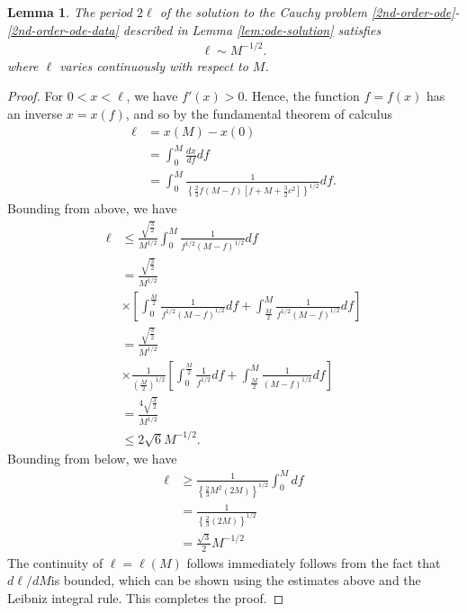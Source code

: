 \documentclass[12pt,reqno]{amsart}
\numberwithin{equation}{section}  %
\newtheorem{lemma}[theorem]{Lemma}
\begin{document}
%
%
%
%
%
%
%
%
%
\newpage
\begin{lemma}
  The period $2 \ell$ of the solution to the Cauchy problem
  \eqref{2nd-order-ode}-\eqref{2nd-order-ode-data} described in Lemma
  \ref{lem:ode-solution} satisfies
  \begin{equation}
  \begin{split}
    \ell \sim M^{-1/2}.
  \end{split}
  \label{period-est}
  \end{equation}
  where $\ell$ varies continuously with respect to $M$.
\label{lem:period-est}
\end{lemma}
%
%
%
%
\begin{proof}
%
For $0 < x < \ell$, we have $f'(x) > 0$. Hence, the function $f = f(x)$ has an
inverse $x = x(f)$, and so by the fundamental theorem of calculus 
%
%
\begin{equation*}
\begin{split}
\ell & = x(M) - x(0)
\\
& = \int_{0}^{M} \frac{dx}{df} df
\\
& = \int_{0}^{M} \frac{1}{ \left\{ \frac{2}{3}f(M-f)
\left[ f + M + \frac{3}{2} c^{2} \right] \right\}^{1/2}} df.
\end{split}
\end{equation*}
%
Bounding from above, we have
%
%
\begin{equation*}
\begin{split}
\ell
& \le \frac{\sqrt{\frac{3}{2}}}{M^{1/2}} \int_{0}^{M} \frac{1}{f^{1/2}(M-f)^{1/2}}df
\\
& = \frac{\sqrt{\frac{3}{2}}}
{M^{1/2}} 
\\
& \times \left[ \int_{0}^{\frac{M}{2}} \frac{1}{f^{1/2}(M-f)^{1/2}}df 
+ \int_{\frac{M}{2}}^{M} \frac{1}{f^{1/2}(M-f)^{1/2}}df
\right]
\\
& = \frac{\sqrt{\frac{3}{2}}}
{M^{1/2}} 
\\
& \times \frac{1}{\left( \frac{M}{2} \right)^{1/2}} \left[ \int_{0}^{\frac{M}{2}} \frac{1}{f^{1/2}}df 
+ \int_{\frac{M}{2}}^{M} \frac{1}{(M-f)^{1/2}}df
\right]
\\
& = \frac{4 \sqrt{\frac{3}{2}}}
{M^{1/2}} 
\\
& \le 2 \sqrt{6} M ^{-1/2}.
\end{split}
\end{equation*}
%
%
Bounding from below, we have
%
%
\begin{equation*}
\begin{split}
\ell
& \ge  \frac{1}{ \left\{ \frac{2}{3}M^{2}
\left( 2M 
\right) \right\}^{1/2}} \int_{0}^{M} df
\\
& = \frac{1}{\left\{ \frac{2}{3}
\left( 2M 
\right) \right\}^{1/2}} 
\\
& = \frac{\sqrt{3}}{2} M^{-1/2}
\end{split}
\end{equation*}
%
The continuity of $\ell = \ell(M)$ follows immediately follows from the fact
that $d\ell /dM$is bounded, which can be shown using the estimates above and
the Leibniz integral rule. This completes the proof.
\end{proof}
\end{document}
